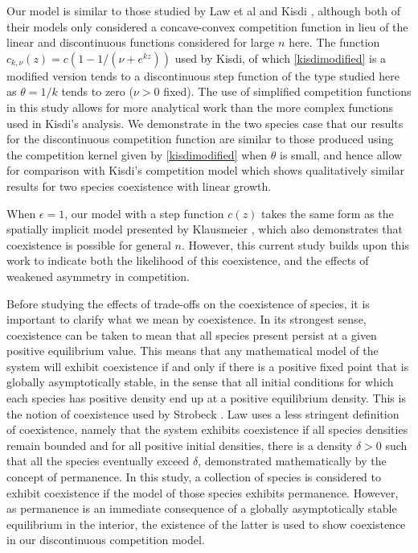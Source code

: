 Our model is similar to those studied by Law et al \cite{law1997evolution} and Kisdi \cite{kisdi1999evolutionary}, although both of their models only considered a concave-convex competition function in lieu of the linear and discontinuous functions considered for large $n$ here. The function $c_{k,\nu}(z) =  c(1-1/(\nu+e^{kz}))$ used by Kisdi, of which \eqref{kisdimodified} is a modified version tends to a discontinuous step function of the type studied here as $\theta = 1/k$ tends to zero ($\nu>0$ fixed). The use of simplified competition functions in this study allows for more analytical work than the more complex functions used in Kisdi's analysis. We demonstrate in the two species case that our results for the discontinuous competition function are similar to those produced using the competition kernel given by \eqref{kisdimodified} when $\theta$ is small, and hence allow for comparison with Kisdi's competition model which shows qualitatively similar results for two species coexistence with linear growth.

When $\epsilon=1$, our model with a step function $c(z)$ takes the same form as the spatially implicit model presented by Klausmeier \cite{klausmeier1998extinction}, which also demonstrates that coexistence is possible for general $n$. However, this current study builds upon this work to indicate both the likelihood of this coexistence, and the effects of weakened asymmetry in competition.

Before studying the effects of trade-offs on the coexistence of species, it is important to clarify what we mean by coexistence. In its strongest sense, coexistence can be taken to mean that all species present persist at a given positive equilibrium value. This means that any mathematical model of the system will exhibit coexistence if and only if there is a positive fixed point that is globally asymptotically stable, in the sense that all initial conditions for which each species has positive density end up at a positive equilibrium density. This is the notion of coexistence used by Strobeck \cite{strobeck1973n}. Law \cite{law1996permanence} uses a less stringent definition of coexistence, namely that the system exhibits coexistence if all species densities remain bounded and for all positive initial densities, there is a  density $\delta>0$ such that all the species eventually exceed $\delta$, demonstrated mathematically by the concept of permanence. In this study, a collection of species is considered to exhibit coexistence if the model of those species exhibits permanence. However, as permanence is an immediate consequence of a globally asymptotically stable equilibrium in the interior, the existence of the latter is used to show coexistence in our discontinuous competition model.

